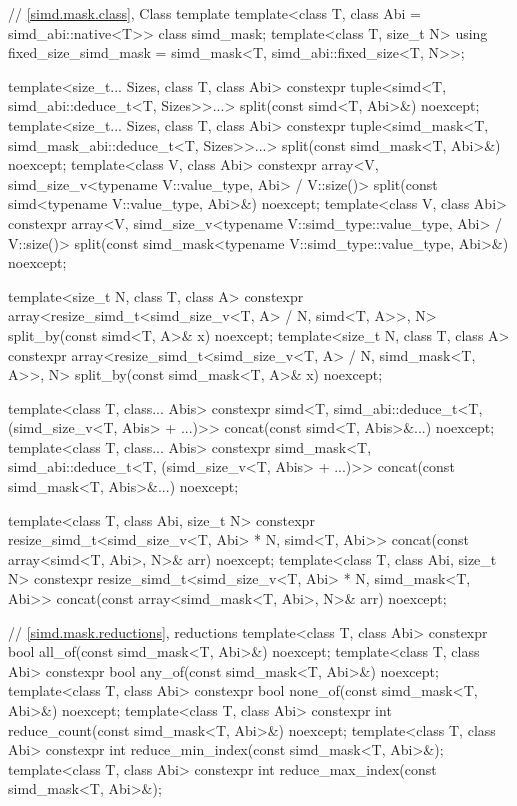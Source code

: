 \begin{codeblock}
{  // \ref{simd.mask.class}, Class template 
  template<class T, class Abi = simd_abi::native<T>> class simd_mask;
  template<class T, size_t N> using fixed_size_simd_mask = simd_mask<T, simd_abi::fixed_size<T, N>>;

  template<size_t... Sizes, class T, class Abi>
    constexpr tuple<simd<T, simd_abi::deduce_t<T, Sizes>>...>
      split(const simd<T, Abi>&) noexcept;
  template<size_t... Sizes, class T, class Abi>
    constexpr tuple<simd_mask<T, simd_mask_abi::deduce_t<T, Sizes>>...>
      split(const simd_mask<T, Abi>&) noexcept;
  template<class V, class Abi>
    constexpr array<V, simd_size_v<typename V::value_type, Abi> / V::size()>
      split(const simd<typename V::value_type, Abi>&) noexcept;
  template<class V, class Abi>
    constexpr array<V, simd_size_v<typename V::simd_type::value_type, Abi> / V::size()>
      split(const simd_mask<typename V::simd_type::value_type, Abi>&) noexcept;

  template<size_t N, class T, class A>
    constexpr array<resize_simd_t<simd_size_v<T, A> / N, simd<T, A>>, N>
      split_by(const simd<T, A>& x) noexcept;
  template<size_t N, class T, class A>
    constexpr array<resize_simd_t<simd_size_v<T, A> / N, simd_mask<T, A>>, N>
      split_by(const simd_mask<T, A>& x) noexcept;

  template<class T, class... Abis>
    constexpr simd<T, simd_abi::deduce_t<T, (simd_size_v<T, Abis> + ...)>>
      concat(const simd<T, Abis>&...) noexcept;
  template<class T, class... Abis>
    constexpr simd_mask<T, simd_abi::deduce_t<T, (simd_size_v<T, Abis> + ...)>>
      concat(const simd_mask<T, Abis>&...) noexcept;

  template<class T, class Abi, size_t N>
    constexpr resize_simd_t<simd_size_v<T, Abi> * N, simd<T, Abi>>
      concat(const array<simd<T, Abi>, N>& arr) noexcept;
  template<class T, class Abi, size_t N>
    constexpr resize_simd_t<simd_size_v<T, Abi> * N, simd_mask<T, Abi>>
      concat(const array<simd_mask<T, Abi>, N>& arr) noexcept;

  // \ref{simd.mask.reductions},  reductions
  template<class T, class Abi> constexpr bool all_of(const simd_mask<T, Abi>&) noexcept;
  template<class T, class Abi> constexpr bool any_of(const simd_mask<T, Abi>&) noexcept;
  template<class T, class Abi> constexpr bool none_of(const simd_mask<T, Abi>&) noexcept;
  template<class T, class Abi> constexpr int reduce_count(const simd_mask<T, Abi>&) noexcept;
  template<class T, class Abi> constexpr int reduce_min_index(const simd_mask<T, Abi>&);
  template<class T, class Abi> constexpr int reduce_max_index(const simd_mask<T, Abi>&);

}
\end{codeblock}
